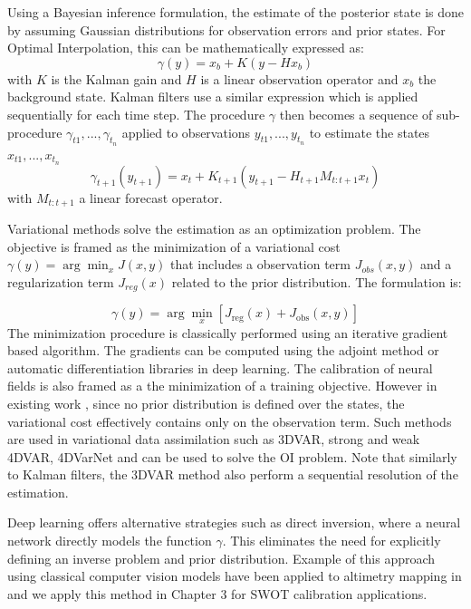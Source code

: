 \begin{bibunit}
Using a Bayesian inference formulation, the estimate of the posterior state is done by assuming Gaussian distributions for observation errors and prior states. 
For Optimal Interpolation, this can be mathematically expressed as:
 $$\gamma(y)= x_b + K(y - Hx_b)$$
with $K$ is the Kalman gain and $H$ is a linear observation operator and $x_b$ the background state.
Kalman filters use a similar expression which is applied sequentially for each time step.
The procedure $\gamma$ then becomes a sequence of sub-procedure $\gamma_{t1}, ..., \gamma_{t_n}$ applied to observations $y_{t1}, ..., y_{t_n}$ to estimate the states $x_{t1}, ..., x_{t_n}$ 
$$\gamma_{t+1}(y_{t+1})= x_{t} + K_{t+1}(y_{t+1} - H_{t+1}M_{t:t+1}x_{t})$$
 with $M_{t:t+1}$ a linear forecast operator.


Variational methods solve the estimation as an optimization problem. The objective is framed as the minimization of a variational cost $\gamma(y) = \arg\min_x J(x, y)$ that includes a observation term $J_{obs}(x, y)$ and a regularization term  $J_{reg}(x)$ related to the prior distribution. The formulation is:

$$ \gamma(y) = \arg\min_x \left[ J_{\text{reg}}(x) + J_{\text{obs}}(x, y) \right]$$
The minimization procedure is classically performed using an iterative gradient based algorithm\cite{carrassiDataAssimilationGeosciences2018}. The gradients can be computed using the adjoint method\cite{lelloucheCopernicusGlobal122021} or automatic differentiation libraries in deep learning\cite{fablet_end2end_2021}.
The calibration of neural fields is also framed as a the minimization of a training objective. However in existing work \cite{johnsonNeuralFieldsFast2022}, since no prior distribution is defined over the states, the variational cost effectively contains only on the observation term.
Such methods are used in variational data assimilation such as 3DVAR, strong and weak 4DVAR, 4DVarNet and can be used to solve the OI problem. Note that similarly to Kalman filters, the 3DVAR method also perform a sequential resolution of the estimation.


Deep learning offers alternative strategies such as direct inversion, where a neural network directly models the function $\gamma$. This eliminates the need for explicitly defining an inverse problem and prior distribution. Example of this approach using classical computer vision models have been applied to altimetry mapping in \cite{manucharyanDeepLearningApproach2021a} and we apply this method in Chapter 3 for SWOT calibration applications.



\end{bibunit}

